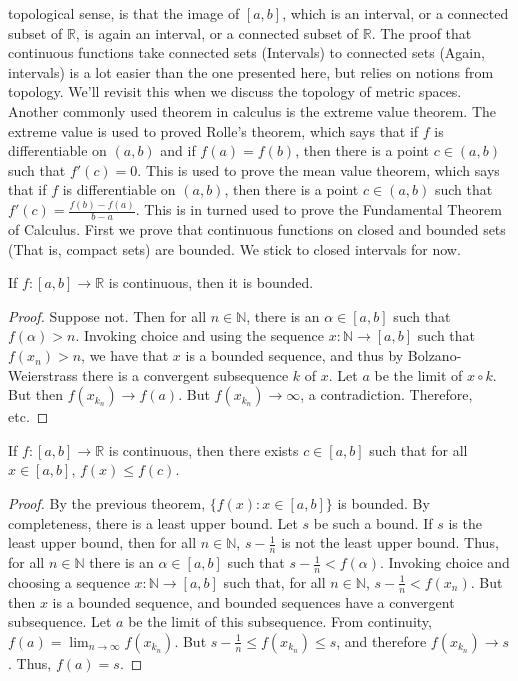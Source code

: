    topological sense, is that the image of $[a,b]$, which is an interval, or a
    connected subset of $\mathbb{R}$, is again an interval, or a connected
    subset of $\mathbb{R}$. The proof that continuous functions take connected
    sets (Intervals) to connected sets (Again, intervals) is a lot easier than
    the one presented here, but relies on notions from topology. We'll revisit
    this when we discuss the topology of metric spaces. Another commonly used
    theorem in calculus is the extreme value theorem. The extreme value is used
    to proved Rolle's theorem, which says that if $f$ is differentiable on
    $(a,b)$ and if $f(a)=f(b)$, then there is a point $c\in(a,b)$ such that
    $f'(c)=0$. This is used to prove the mean value theorem, which says that
    if $f$ is differentiable on $(a,b)$, then there is a point $c\in(a,b)$ such
    that $f'(c)=\frac{f(b)-f(a)}{b-a}$. This is in turned used to prove the
    Fundamental Theorem of Calculus. First we prove that continuous functions
    on closed and bounded sets (That is, compact sets) are bounded. We stick to
    closed intervals for now.
    \begin{theorem}
        If $f:[a,b]\rightarrow\mathbb{R}$ is continuous, then it is bounded.
    \end{theorem}
    \begin{proof}
        Suppose not. Then for all $n\in\mathbb{N}$, there is an
        $\alpha\in[a,b]$ such that $f(\alpha)>n$. Invoking choice and using the
        sequence $x:\mathbb{N}\rightarrow[a,b]$ such that $f(x_{n})>n$, we have
        that $x$ is a bounded sequence, and thus by Bolzano-Weierstrass there
        is a convergent subsequence $k$ of $x$. Let $a$ be the limit of
        $x\circ{k}$. But then $f(x_{k_{n}})\rightarrow{f(a)}$. But
        $f(x_{k_{n}})\rightarrow\infty$, a contradiction. Therefore, etc.
    \end{proof}
    \begin{theorem}
        If $f:[a,b]\rightarrow\mathbb{R}$ is continuous, then there exists
        $c\in[a,b]$ such that for all $x\in[a,b]$, $f(x)\leq{f(c)}$.
    \end{theorem}
    \begin{proof}
        By the previous theorem, $\{f(x):x\in[a,b]\}$ is bounded. By
        completeness, there is a least upper bound. Let $s$ be such a bound.
        If $s$ is the least upper bound, then for all $n\in\mathbb{N}$,
        $s-\frac{1}{n}$ is not the least upper bound. Thus, for all
        $n\in\mathbb{N}$ there is an $\alpha\in[a,b]$ such that
        $s-\frac{1}{n}<f(\alpha)$. Invoking choice and choosing a sequence
        $x:\mathbb{N}\rightarrow[a,b]$ such that, for all $n\in\mathbb{N}$,
        $s-\frac{1}{n}<f(x_{n})$. But then $x$ is a bounded sequence, and
        bounded sequences have a convergent subsequence. Let $a$ be the limit
        of this subsequence. From continuity,
        $f(a)=\lim_{n\rightarrow\infty}f(x_{k_{n}})$. But
        $s-\frac{1}{n}\leq{f(x_{k_{n}})}\leq{s}$, and therefore
        $f(x_{k_{n}})\rightarrow{s}$. Thus, $f(a)=s$.
    \end{proof}

